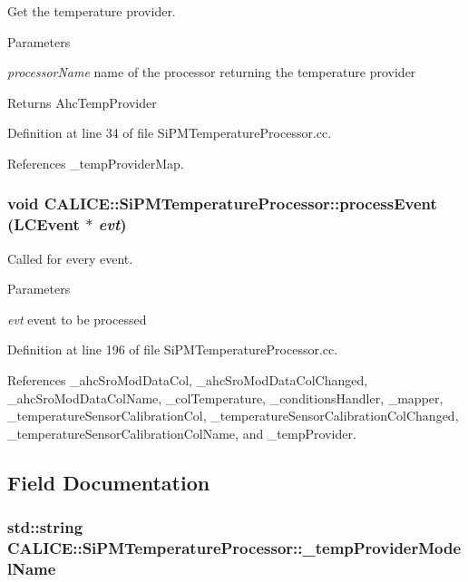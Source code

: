 Get the temperature provider. 
\begin{DoxyParams}{Parameters}
\item[{\em processorName}]name of the processor returning the temperature provider \end{DoxyParams}
\begin{DoxyReturn}{Returns}
AhcTempProvider 
\end{DoxyReturn}


Definition at line 34 of file SiPMTemperatureProcessor.cc.

References \_\-tempProviderMap.
\subsubsection[{processEvent}]{\setlength{\rightskip}{0pt plus 5cm}void CALICE::SiPMTemperatureProcessor::processEvent (LCEvent $\ast$ {\em evt})\hspace{0.3cm}{\ttfamily  [virtual]}}\label{classCALICE_1_1SiPMTemperatureProcessor_a9724f37f98d88c56707192b3ccd8f778}


Called for every event. 
\begin{DoxyParams}{Parameters}
\item[{\em evt}]event to be processed \end{DoxyParams}


Definition at line 196 of file SiPMTemperatureProcessor.cc.

References \_\-ahcSroModDataCol, \_\-ahcSroModDataColChanged, \_\-ahcSroModDataColName, \_\-colTemperature, \_\-conditionsHandler, \_\-mapper, \_\-temperatureSensorCalibrationCol, \_\-temperatureSensorCalibrationColChanged, \_\-temperatureSensorCalibrationColName, and \_\-tempProvider.

\subsection{Field Documentation}
\subsubsection[{\_\-tempProviderModelName}]{\setlength{\rightskip}{0pt plus 5cm}std::string {\bf CALICE::SiPMTemperatureProcessor::\_\-tempProviderModelName}\hspace{0.3cm}{\ttfamily  [private]}}\label{classCALICE_1_1SiPMTemperatureProcessor_afdc26a29605485025b7f81dbc3c24aee}


